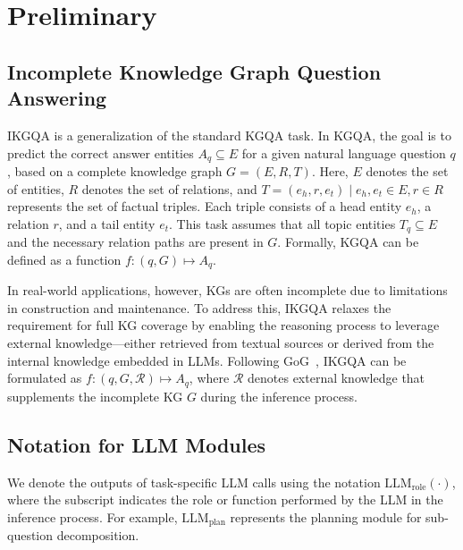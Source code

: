 \section{Preliminary}


\subsection{Incomplete Knowledge Graph Question Answering}
IKGQA is a generalization of the standard KGQA task. In KGQA, the goal is to predict the correct answer entities $A_q \subseteq E$ for a given natural language question $q$, based on a complete knowledge graph $G = (E, R, T)$. Here, $E$ denotes the set of entities, $R$ denotes the set of relations, and $T = { (e_h, r, e_t) \mid e_h, e_t \in E, r \in R }$ represents the set of factual triples. Each triple consists of a head entity $e_h$, a relation $r$, and a tail entity $e_t$. This task assumes that all topic entities $T_q \subseteq E$ and the necessary relation paths are present in $G$. Formally, KGQA can be defined as a function ${f: (q, G) \mapsto A_q}$.

In real-world applications, however, KGs are often incomplete due to limitations in construction and maintenance. To address this, IKGQA relaxes the requirement for full KG coverage by enabling the reasoning process to leverage external knowledge—either retrieved from textual sources or derived from the internal knowledge embedded in LLMs. Following GoG~\cite{xu2024generate}, IKGQA can be formulated as ${f: (q, G, \mathcal{R}) \mapsto A_q}$, where $\mathcal{R}$ denotes external knowledge that supplements the incomplete KG $G$ during the inference process.


\subsection{Notation for LLM Modules}  
We denote the outputs of task-specific LLM calls using the notation $\text{LLM}_{\text{role}}(\cdot)$, where the subscript indicates the role or function performed by the LLM in the inference process. For example, $\text{LLM}_{\text{plan}}$ represents the planning module for sub-question decomposition.



